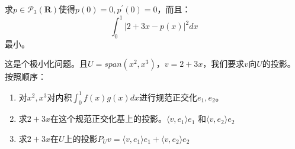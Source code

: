 \documentclass[10pt,a4paper,UTF8]{article}
\begin{document}
\begin{tikzproblem}
求\(p\in \mathcal{P}_{3}(\mathbf{R})\)使得\(p(0) =0,p^{'}(0) =0\)，而且：
\begin{equation}
\label{eq:5}
\int_{0}^{1} |2+3x-p(x)|^{2}dx
\end{equation}
最小。
\end{tikzproblem}
\begin{tikzanswer}
这是个极小化问题。且\(U = span(x^{2},x^{3})\)，\(v = 2+3x\)，我们要求\(v\)向\(U\)的投影。按照顺序：
\begin{enumerate}
\item 对\(x^{2},x^{3}\)对内积\(\int_{0}^{1}f(x)g(x)dx\)进行规范正交化\(e_{1},e_{2}\)。
\item 求\(2+3x\)在这个规范正交化基上的投影。\(\langle v,e_{1} \rangle e_{1}\) 和\(\langle v,e_{2} \rangle e_{2}\)
\item 求\(2+3x\)在\(U\)上的投影\(P_{U}v =  \langle v,e_{1} \rangle e_{1} +  \langle v,e_{2} \rangle e_{2}\)
\end{enumerate}
\end{tikzanswer}
\end{document}
